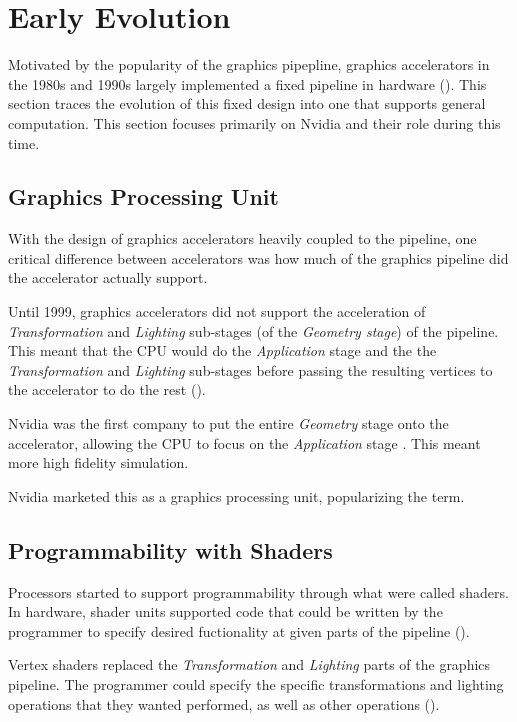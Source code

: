 \section{Early Evolution}

Motivated by the popularity of the graphics pipepline, graphics accelerators
in the 1980s and 1990s largely implemented a fixed pipeline in hardware (\cite{mcclanahan2010history}). This section
traces the evolution of this fixed design into one that supports general computation.
This section focuses primarily on Nvidia and their role during this time.

\subsection{Graphics Processing Unit}

With the design of graphics accelerators heavily coupled to the pipeline,
one critical difference between accelerators was how much of the
graphics pipeline did the accelerator actually support.

Until 1999, graphics accelerators did not support the acceleration of
\textit{Transformation} and \textit{Lighting} sub-stages (of the
\textit{Geometry stage}) of the pipeline.
This meant that the CPU would do the \textit{Application} stage and the
the \textit{Transformation} and \textit{Lighting} sub-stages before passing
the resulting vertices to the accelerator to do the rest (\cite{mcclanahan2010history}).

Nvidia was the first company to put the entire \textit{Geometry} stage
onto the accelerator, allowing the CPU to focus on the \textit{Application}
stage \cite{nvidia256}. This meant more high fidelity simulation.

Nvidia marketed this as a graphics processing unit, popularizing the term.

\subsection{Programmability with Shaders}

Processors started to support programmability through what were called shaders.
In hardware, shader units supported code that could be written by the programmer
to specify desired fuctionality at given parts of the pipeline (\cite{mcclanahan2010history}).

Vertex shaders replaced the \textit{Transformation} and \textit{Lighting} parts
of the graphics pipeline. The programmer could specify the specific 
transformations and lighting operations that they wanted performed, as well
as other operations (\cite{lsu}). 

